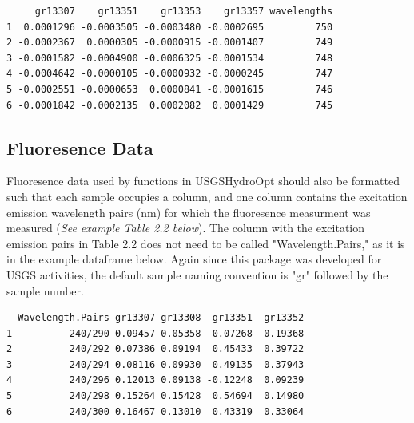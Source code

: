\documentclass[a4paper,11pt]{article}\usepackage[]{graphicx}\usepackage[]{color}
\makeatletter
\newenvironment{kframe}{%
 \def\at@end@of@kframe{}%
 \ifinner\ifhmode%
  \def\at@end@of@kframe{\end{minipage}}%
  \begin{minipage}{\columnwidth}%
 \fi\fi%
 \def\FrameCommand##1{\hskip\@totalleftmargin \hskip-\fboxsep
 \colorbox{shadecolor}{##1}\hskip-\fboxsep
     \hskip-\linewidth \hskip-\@totalleftmargin \hskip\columnwidth}%
 \MakeFramed {\advance\hsize-\width
   \@totalleftmargin\z@ \linewidth\hsize
   \@setminipage}}%
 {\par\unskip\endMakeFramed%
 \at@end@of@kframe}
\newenvironment{knitrout}{}{} %
\makeatother
\begin{document}
\begin{knitrout}
\color{fgcolor}\begin{kframe}
\begin{verbatim}
     gr13307    gr13351    gr13353    gr13357 wavelengths
1  0.0001296 -0.0003505 -0.0003480 -0.0002695         750
2 -0.0002367  0.0000305 -0.0000915 -0.0001407         749
3 -0.0001582 -0.0004900 -0.0006325 -0.0001534         748
4 -0.0004642 -0.0000105 -0.0000932 -0.0000245         747
5 -0.0002551 -0.0000653  0.0000841 -0.0001615         746
6 -0.0001842 -0.0002135  0.0002082  0.0001429         745
\end{verbatim}
\end{kframe}
\end{knitrout}

\subsection{Fluoresence Data}
Fluoresence data used by functions in USGSHydroOpt should also be formatted such that each sample occupies a column, and one column contains the excitation emission wavelength pairs (nm) for which the fluoresence measurment was measured (\emph{See example Table 2.2 below}). The column with the excitation emission pairs in Table 2.2 does not need to be called "Wavelength.Pairs," as it is in the example dataframe below. Again since this package was developed for USGS activities, the default sample naming convention is "gr" followed by the sample number.

\begin{knitrout}
\color{fgcolor}\begin{kframe}
\begin{verbatim}
  Wavelength.Pairs gr13307 gr13308  gr13351  gr13352
1          240/290 0.09457 0.05358 -0.07268 -0.19368
2          240/292 0.07386 0.09194  0.45433  0.39722
3          240/294 0.08116 0.09930  0.49135  0.37943
4          240/296 0.12013 0.09138 -0.12248  0.09239
5          240/298 0.15264 0.15428  0.54694  0.14980
6          240/300 0.16467 0.13010  0.43319  0.33064
\end{verbatim}
\end{kframe}
\end{knitrout}

\end{document}
